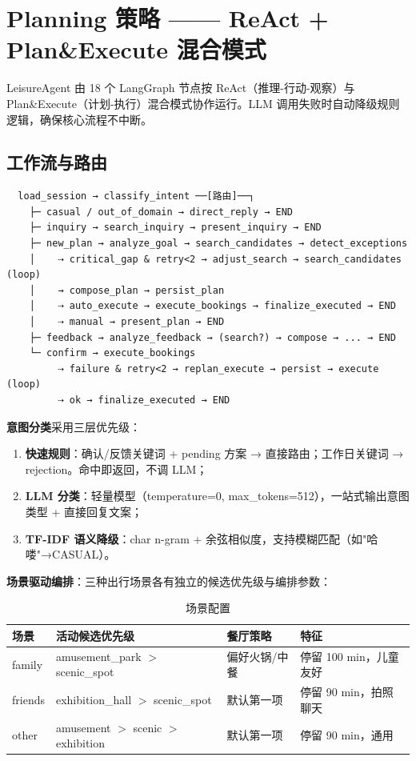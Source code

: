 \documentclass[10pt,a4paper]{ctexart}
\begin{document}
\section{Planning 策略 —— ReAct + Plan\&Execute 混合模式}

LeisureAgent 由 18 个 LangGraph 节点按 ReAct（推理-行动-观察）与 Plan\&Execute（计划-执行）混合模式协作运行。LLM 调用失败时自动降级规则逻辑，确保核心流程不中断。

\subsection{工作流与路由}

{\footnotesize
\begin{verbatim}
  load_session → classify_intent ──[路由]──┐
    ├─ casual / out_of_domain → direct_reply → END
    ├─ inquiry → search_inquiry → present_inquiry → END
    ├─ new_plan → analyze_goal → search_candidates → detect_exceptions
    │    ⇢ critical_gap & retry<2 → adjust_search → search_candidates (loop)
    │    → compose_plan → persist_plan
    │    ⇢ auto_execute → execute_bookings → finalize_executed → END
    │    ⇢ manual → present_plan → END
    ├─ feedback → analyze_feedback → (search?) → compose → ... → END
    └─ confirm → execute_bookings
         ⇢ failure & retry<2 → replan_execute → persist → execute (loop)
         ⇢ ok → finalize_executed → END
\end{verbatim}
}

\textbf{意图分类}采用三层优先级：
\begin{enumerate}[label=(\arabic*)]
  \item \textbf{快速规则}：确认/反馈关键词 + pending 方案 → 直接路由；工作日关键词 → rejection。命中即返回，不调 LLM；
  \item \textbf{LLM 分类}：轻量模型（temperature=0, max\_tokens=512），一站式输出意图类型 + 直接回复文案；
  \item \textbf{TF-IDF 语义降级}：char n-gram + 余弦相似度，支持模糊匹配（如"哈喽"→CASUAL）。
\end{enumerate}

\textbf{场景驱动编排}：三种出行场景各有独立的候选优先级与编排参数：

\begin{table}[ht!]
\centering\small\setlength{\tabcolsep}{4pt}
\begin{tabular}{p{2cm}p{3.5cm}p{3cm}p{4cm}}
\toprule
\textbf{场景} & \textbf{活动候选优先级} & \textbf{餐厅策略} & \textbf{特征} \\
\midrule
family  & amusement\_park $>$ scenic\_spot & 偏好火锅/中餐 & 停留 100 min，儿童友好 \\
friends & exhibition\_hall $>$ scenic\_spot & 默认第一项   & 停留 90 min，拍照聊天 \\
other   & amusement $>$ scenic $>$ exhibition & 默认第一项   & 停留 90 min，通用 \\
\bottomrule
\end{tabular}
\caption{场景配置}
\end{table}
\end{document}
